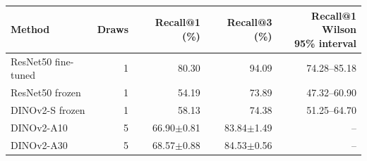 \begin{tabular}{lrrrr}
\toprule
Method & Draws & Recall@1 (\%) & Recall@3 (\%) & \makecell{Recall@1 Wilson\\95\% interval} \\
\midrule
ResNet50 fine-tuned & 1 & 80.30 & 94.09 & 74.28--85.18 \\
ResNet50 frozen & 1 & 54.19 & 73.89 & 47.32--60.90 \\
DINOv2-S frozen & 1 & 58.13 & 74.38 & 51.25--64.70 \\
DINOv2-A10 & 5 & 66.90$\pm$0.81 & 83.84$\pm$1.49 & -- \\
DINOv2-A30 & 5 & 68.57$\pm$0.88 & 84.53$\pm$0.56 & -- \\
\bottomrule
\end{tabular}
